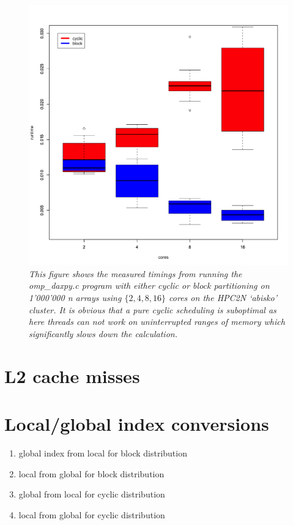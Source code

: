 \documentclass[a4paper,11pt,twoside]{article}
\begin{document}
\begin{figure}
  \centering
  \includegraphics[width=1\textwidth]{daxpy.png}
  \caption{\textit{This figure shows the measured timings from running the omp\_daxpy.c program with either cyclic or block partitioning on 1'000'000 n arrays using $\{2, 4, 8, 16\}$ cores on the HPC2N `abisko' cluster. It is obvious that a pure cyclic scheduling is suboptimal as here threads can not work on uninterrupted ranges of memory which significantly slows down the calculation.}}
  \label{fig:daxpy}
\end{figure}

\section{L2 cache misses}

\section{Local/global index conversions}
\begin{enumerate}[label={\alph*)}]
\item global index from local for block distribution
\item local from global for block distribution
\item global from local for cyclic distribution
\item local from global for cyclic distribution
\end{enumerate}
\end{document}
